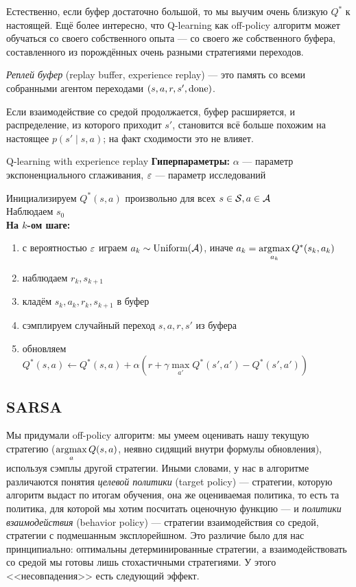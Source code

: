 Естественно, если буфер достаточно большой, то мы выучим очень близкую $Q^*$ к настоящей. Ещё более интересно, что Q-learning как off-policy алгоритм может обучаться со своего собственного опыта --- со своего же собственного буфера, составленного из порождённых очень разными стратегиями переходов. 

\begin{definition}
\emph{Реплей буфер} (replay buffer, experience replay) --- это память со всеми собранными агентом переходами $(s, a, r, s', \mathrm{done})$.
\end{definition}

Если взаимодействие со средой продолжается, буфер расширяется, и распределение, из которого приходит $s'$, становится всё больше похожим на настоящее $p(s' \mid s, a)$; на факт сходимости это не влияет.

\begin{algorithm}{Q-learning with experience replay}
\textbf{Гиперпараметры:} $\alpha$ --- параметр экспоненциального сглаживания, $\varepsilon$ --- параметр исследований

\vspace{0.3cm}
Инициализируем $Q^*(s, a)$ произвольно для всех $s \in \mathcal{S}, a \in \mathcal{A}$ \\
Наблюдаем $s_0$ \\ 
\textbf{На $k$-ом шаге:}
\begin{enumerate}
    \item с вероятностью $\varepsilon$ играем $a_k \sim \operatorname{Uniform}(\mathcal{A})$, иначе $a_k = \mathop{\mathrm{argmax}}\limits_{a_k} Q^*(s_k, a_k)$
    \item наблюдаем $r_k, s_{k+1}$
    \item кладём $s_k, a_k, r_k, s_{k+1}$ в буфер
    \item сэмплируем случайный переход $s, a, r, s'$ из буфера
    \item обновляем $Q^*(s, a) \leftarrow Q^*(s, a) + \alpha \left( r + \gamma \max\limits_{a'} Q^*(s', a') - Q^*(s', a') \right)$
\end{enumerate}
\end{algorithm}

\subsection{SARSA}\label{subsec:sarsa}

Мы придумали off-policy алгоритм: мы умеем оценивать нашу текущую стратегию ($\mathop{\mathrm{argmax}}\limits_a Q(s, a)$, неявно сидящий внутри формулы обновления), используя сэмплы другой стратегии. Иными словами, у нас в алгоритме различаются понятия \emph{целевой политики} (target policy) --- стратегии, которую алгоритм выдаст по итогам обучения, она же оцениваемая политика, то есть та политика, для которой мы хотим посчитать оценочную функцию --- и \emph{политики взаимодействия} (behavior policy) --- стратегии взаимодействия со средой, стратегии с подмешанным эксплорейшном. Это различие было для нас принципиально: оптимальны детерминированные стратегии, а взаимодействовать со средой мы готовы лишь стохастичными стратегиями. У этого <<несовпадения>> есть следующий эффект.

